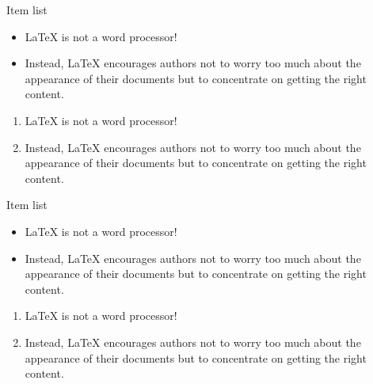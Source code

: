 \documentclass{beamer}
\begin{document}
\begin{frame}{Item list}
\begin{itemize}
\item LaTeX is not a word processor! 
\item Instead, LaTeX encourages authors not to worry too much about the appearance of their documents but to concentrate on getting the right content.
\end{itemize}


\begin{enumerate}
\item LaTeX is not a word processor! 
\item Instead, LaTeX encourages authors not to worry too much about the appearance of their documents but to concentrate on getting the right content.
\end{enumerate}
\end{frame}



\begin{frame}{Item list}
\begin{itemize}
\item<1-2> LaTeX is not a word processor! 
\item<2-> Instead, LaTeX encourages authors not to worry too much about the appearance of their documents but to concentrate on getting the right content.
\end{itemize}


\begin{enumerate}
\item<3> LaTeX is not a word processor! 
\item<4> Instead, LaTeX encourages authors not to worry too much about the appearance of their documents but to concentrate on getting the right content.
\end{enumerate}
\end{frame}
\end{document}
